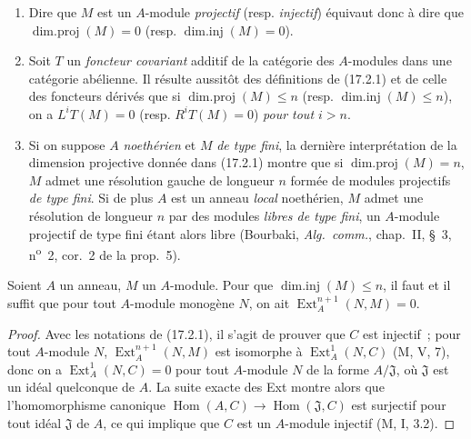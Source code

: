 \begin{remarks}[17.2.2]
\label{0.17.2.2-fr}
\begin{enumerate}
  \item[\rm (i)] Dire que $M$ est un $A$-module \emph{projectif} (resp.
  \emph{injectif}) équivaut donc à dire que
  $\operatorname{dim.proj}(M)=0$ (resp. $\operatorname{dim.inj}(M)=0$).
  \item[\rm (ii)] Soit $T$ un \emph{foncteur covariant} additif de la catégorie
  des $A$-modules dans une catégorie abélienne. Il résulte aussitôt des
  définitions de (17.2.1) et de celle des
  foncteurs dérivés que si $\operatorname{dim.proj}(M)\leq n$ (resp.
  $\operatorname{dim.inj}(M)\leq n$), on a $L^iT(M)=0$ (resp.
  $R^iT(M)=0$) \emph{pour tout $i>n$}.
  \item[\rm (iii)] Si on suppose $A$ \emph{noethérien} et $M$ \emph{de type
  fini}, la dernière interprétation de la dimension projective donnée dans
  (17.2.1) montre que si $\operatorname{dim.proj}(M)=n$, $M$ admet une
  résolution gauche de longueur $n$ formée de modules projectifs \emph{de type
  fini}. Si de plus $A$ est un anneau \emph{local} noethérien, $M$ admet une
  résolution de longueur $n$ par des modules \emph{libres de type fini}, un
  $A$-module projectif de type fini étant alors libre (Bourbaki,
  \emph{Alg.~comm.}, chap.~II, \S~3, n\textsuperscript{o}~2, cor.~2 de la prop.~5).
\end{enumerate}
\end{remarks}

\begin{lemma}[17.2.3]
\label{0.17.2.3-fr}
Soient $A$ un anneau, $M$ un $A$-module. Pour que
$\operatorname{dim.inj}(M)\leq n$, il faut et il suffit que pour tout
$A$-module \textup{monogène} $N$, on ait $\operatorname{Ext}^{n+1}_A(N,M)=0$.
\end{lemma}

\begin{proof}
Avec les notations de (17.2.1), il s'agit de prouver que $C$ est injectif~;
pour tout $A$-module $N$, $\operatorname{Ext}^{n+1}_A(N,M)$ est isomorphe à
$\operatorname{Ext}^1_A(N,C)$ (M, V, 7), donc on a
$\operatorname{Ext}^1_A(N,C)=0$ pour tout $A$-module $N$ de la forme
$A/\mathfrak{J}$, où $\mathfrak{J}$ est un idéal quelconque de $A$. La suite
exacte des Ext montre alors que l'homomorphisme canonique
$\operatorname{Hom}(A,C)\longrightarrow\operatorname{Hom}(\mathfrak{J},C)$ est
surjectif pour tout idéal $\mathfrak{J}$ de $A$, ce qui implique que $C$ est un
$A$-module injectif (M, I, 3.2).
\end{proof}

